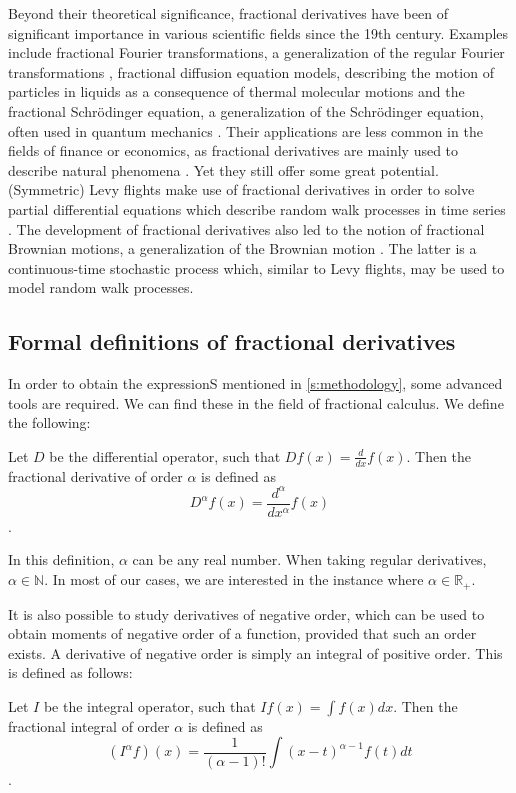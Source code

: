 Beyond their theoretical significance, fractional derivatives have been of significant importance in various scientific fields since the 19th century. Examples include fractional Fourier transformations, a generalization of the regular Fourier transformations \cite{missbauer2012}, fractional diffusion equation models, describing the motion of particles in liquids as a consequence of thermal molecular motions \cite{einstein1905} and the fractional Schrödinger equation, a generalization of the Schrödinger equation, often used in quantum mechanics \cite{laskin2002}. Their applications are less common in the fields of finance or economics, as fractional derivatives are mainly used to describe natural phenomena \cite{boulaaras2023}. Yet they still offer some great potential. (Symmetric) Levy flights make use of fractional derivatives in order to solve partial differential equations which describe random walk processes in time series \cite{scalas2000}. The development of fractional derivatives also led to the notion of fractional Brownian motions, a generalization of the Brownian motion \cite{mandelbrot1968}. The latter is a continuous-time stochastic process which, similar to Levy flights, may be used to model random walk processes.
\subsection{Formal definitions of fractional derivatives}
In order to obtain the expressionS mentioned in \autoref{s:methodology}, some advanced tools are required. We can find these in the field of fractional calculus.
We define the following:
\begin{definition}
    Let \(D\) be the differential operator, such that \(D f(x) = \frac{d}{dx} f(x)\). Then the fractional derivative of order \(\alpha\) is defined as \[D^{\alpha} f(x) = \frac{d^{\alpha}}{dx^{\alpha}} f(x)\].
\end{definition}
In this definition, \(\alpha\) can be any real number. When taking regular derivatives, \(\alpha \in \mathbb{N}\). In most of our cases, we are interested in the instance where  \(\alpha \in \mathbb{R}_+\).

It is also possible to study derivatives of negative order, which can be used to obtain moments of negative order of a function, provided that such an order exists. A derivative of negative order is simply an integral of positive order. This is defined as follows:
\begin{definition}
    Let \(I\) be the integral operator, such that \(I f(x) = \int f(x) dx\). Then the fractional integral of order \(\alpha\) is defined as \[(I^{\alpha} f) (x) = \frac{1}{(\alpha-1)!}\int (x-t)^{\alpha-1} f(t) dt\] \cite{cauchy1823}.
\end{definition} 

